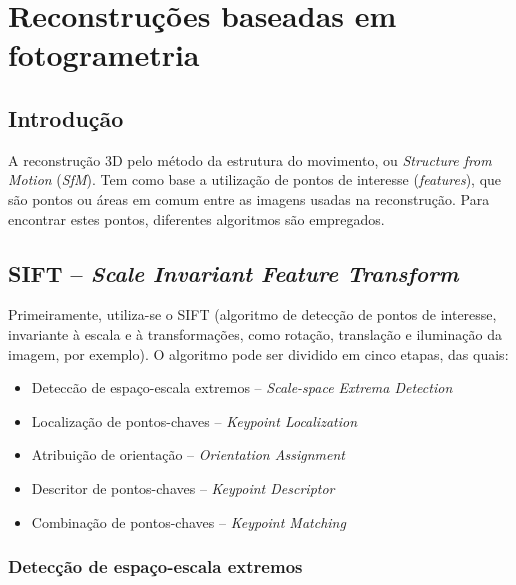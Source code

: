 \chapter{Reconstruções baseadas em fotogrametria}\label{cap:pontosdeinteresse}
%
\section{Introdução}

A reconstrução 3D pelo método da estrutura do movimento, ou {\it Structure from Motion} ({\it SfM}). Tem como base a utilização de pontos de interesse
({\it features}), que são pontos ou áreas em comum entre as imagens usadas na reconstrução. Para encontrar estes pontos, diferentes algoritmos são empregados.

\section{ SIFT -- {\it Scale Invariant Feature Transform}}

Primeiramente, utiliza-se o SIFT (algoritmo de detecção de pontos de interesse, invariante à escala e à transformações, como rotação, translação e iluminação da imagem, por exemplo).
O algoritmo pode ser dividido em cinco etapas, das quais:

\begin{itemize}
	\item{Deteccão de espaço-escala extremos -- {\it Scale-space Extrema Detection}}
	\item{Localização de pontos-chaves -- {\it Keypoint Localization}}
	\item{Atribuição de orientação -- {\it Orientation Assignment}}
	\item{Descritor de pontos-chaves -- {\it Keypoint Descriptor}}
	\item{Combinação de pontos-chaves -- {\it Keypoint Matching}}
\end{itemize}


\subsection{Detecção de espaço-escala extremos}


